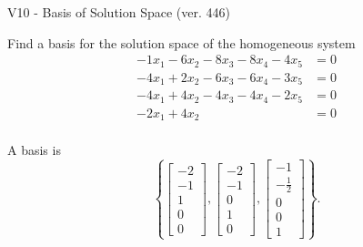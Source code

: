 \begin{exercise}
  \begin{exerciseTitle}V10 - Basis of Solution Space (ver. 446)\end{exerciseTitle}
  \begin{exerciseStatement}
    Find a basis for the solution space of the homogeneous system 
\begin{align*}
 -1 x_ 1 -6 x_ 2 -8 x_ 3 -8 x_ 4 -4 x_ 5 &= 0  \\ 
  -4 x_ 1 + 2 x_ 2 -6 x_ 3 -6 x_ 4 -3 x_ 5 &= 0  \\ 
  -4 x_ 1 + 4 x_ 2 -4 x_ 3 -4 x_ 4 -2 x_ 5 &= 0  \\ 
  -2 x_ 1 + 4 x_ 2 &= 0  \\ 
 \end{align*}


 
  \end{exerciseStatement}

  \begin{exerciseAnswer}
   A basis is   
\[\left\{\left[\begin{array}{c}
-2 \\
-1 \\
1 \\
0 \\
0
\end{array}\right] , \left[\begin{array}{c}
-2 \\
-1 \\
0 \\
1 \\
0
\end{array}\right] , \left[\begin{array}{c}
-1 \\
-\frac{1}{2} \\
0 \\
0 \\
1
\end{array}\right]\right\}.\]

  


  \end{exerciseAnswer}
\end{exercise}